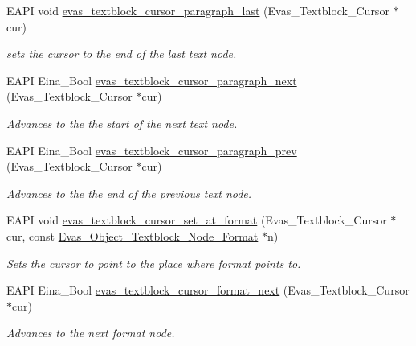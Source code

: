 \begin{DoxyCompactItemize}
EAPI void \hyperlink{group__Evas__Object__Textblock_ga2654bf905bdd0fe98402abe105c815d0}{evas\_\-textblock\_\-cursor\_\-paragraph\_\-last} (Evas\_\-Textblock\_\-Cursor $\ast$cur)
\begin{DoxyCompactList}\small\item\em sets the cursor to the end of the last text node. \item\end{DoxyCompactList}\item 
EAPI Eina\_\-Bool \hyperlink{group__Evas__Object__Textblock_ga85773221b22e6d042cc6b581de08c87a}{evas\_\-textblock\_\-cursor\_\-paragraph\_\-next} (Evas\_\-Textblock\_\-Cursor $\ast$cur)
\begin{DoxyCompactList}\small\item\em Advances to the the start of the next text node. \item\end{DoxyCompactList}\item 
EAPI Eina\_\-Bool \hyperlink{group__Evas__Object__Textblock_gabe9fa26c799408129f013440e518f699}{evas\_\-textblock\_\-cursor\_\-paragraph\_\-prev} (Evas\_\-Textblock\_\-Cursor $\ast$cur)
\begin{DoxyCompactList}\small\item\em Advances to the the end of the previous text node. \item\end{DoxyCompactList}\item 
EAPI void \hyperlink{group__Evas__Object__Textblock_ga74682be12e8108f2956ab8b02f39d9ab}{evas\_\-textblock\_\-cursor\_\-set\_\-at\_\-format} (Evas\_\-Textblock\_\-Cursor $\ast$cur, const \hyperlink{Evas_8h_adcd2409468741c89d607f06e17da1f64}{Evas\_\-Object\_\-Textblock\_\-Node\_\-Format} $\ast$n)
\begin{DoxyCompactList}\small\item\em Sets the cursor to point to the place where format points to. \item\end{DoxyCompactList}\item 
EAPI Eina\_\-Bool \hyperlink{group__Evas__Object__Textblock_gaedae64aa95805f0c3480cf6001297ae9}{evas\_\-textblock\_\-cursor\_\-format\_\-next} (Evas\_\-Textblock\_\-Cursor $\ast$cur)
\begin{DoxyCompactList}\small\item\em Advances to the next format node. \item\end{DoxyCompactList}\item 

\end{DoxyCompactItemize}
